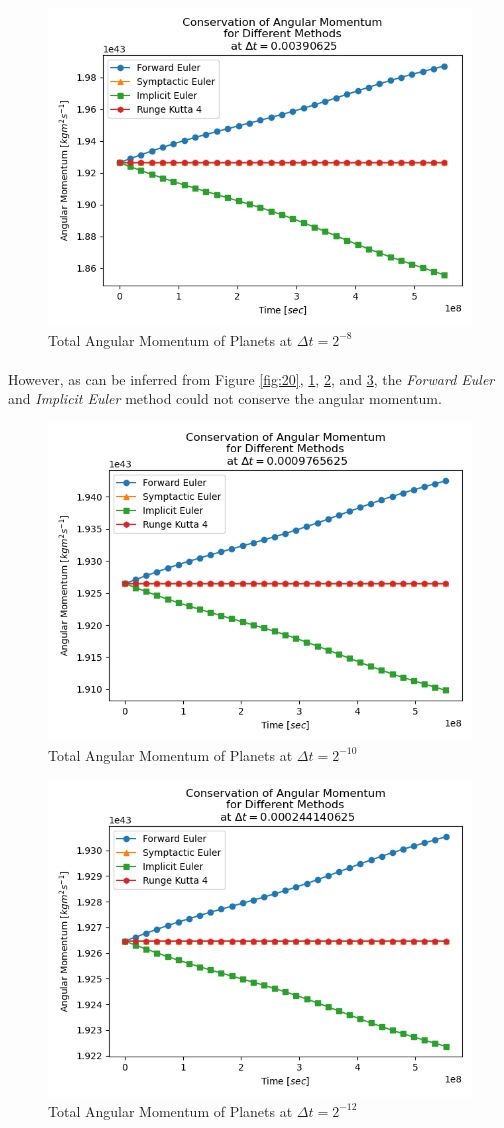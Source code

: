 \documentclass[letterpaper,12pt]{article}
\begin{document}
    \begin{figure}[H]
    \centerline{\includegraphics[width=0.7\linewidth]{figures/21.png}}
    \caption{Total Angular Momentum of Planets at $\Delta t = 2^{-8}$}
    \label{fig:21}
    \end{figure}
\paragraph{}However, as can be inferred from Figure \ref{fig:20}, \ref{fig:21}, \ref{fig:22}, and \ref{fig:23}, the \textit{Forward Euler} and \textit{Implicit Euler} method could not conserve the angular momentum.
    \begin{figure}[H]
    \centerline{\includegraphics[width=0.7\linewidth]{figures/22.png}}
    \caption{Total Angular Momentum of Planets at $\Delta t = 2^{-10}$}
    \label{fig:22}
    \end{figure}
    
    \begin{figure}[H]
    \centerline{\includegraphics[width=0.7\linewidth]{figures/23.png}}
    \caption{Total Angular Momentum of Planets at $\Delta t = 2^{-12}$}
    \label{fig:23}
    \end{figure}
\end{document}
